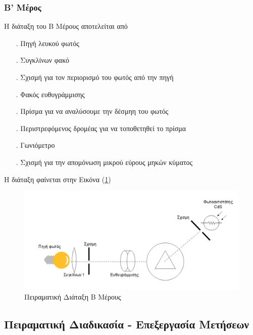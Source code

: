 \documentclass[a4paper]{article}
\begin{document}
			
	\subsubsection*{B' Μέρος}
		H διάταξη του Β Μέρους αποτελείται από
			\begin{itemize}
			\item[.] Πηγή λευκού φωτός\vspace{-0.2cm}
			\item[.] Συγκλίνων φακό\vspace{-0.2cm}
			\item[.] Σχισμή για τον περιορισμό του φωτός από την πηγή  \vspace{-0.2cm}
			\item[.] Φακός ευθυγράμμισης \vspace{-0.2cm}
				\item[.] Πρίσμα για να αναλύσουμε την δέσμηη του φωτός \vspace{-0.2cm}
				\item[.]  Περιστρεφόμενος δρομέας για να τοποθετηθεί το πρίσμα \vspace{-0.2cm}
				\item[.]  Γωνιόμετρο\vspace{-0.2cm}
				\item[.] Σχισμή για την απομόνωση μικρού εύρους μηκών κύματος\vspace{-0.2cm}
							\end{itemize}
	Η διάταξη φαίνεται στην Εικόνα (\ref{im2})
	
		\begin{figure}[h!]
			\centering
		\includegraphics[scale=0.3]{part2.png}
		\caption{Πειραματική Διάταξη Β Μέρους}
		\label{im2}
		\end{figure}
	
	
\subsection*{Πειραματική Διαδικασία - Επεξεργασία Μετήσεων }
\end{document}
